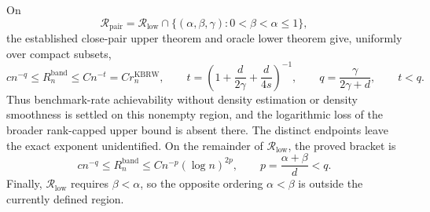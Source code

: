 On
\[
\mathcal R_{\mathrm{pair}}
=\mathcal R_{\mathrm{low}}\cap
\{(\alpha,\beta,\gamma):0<\beta<\alpha\leq1\},
\]
the established close-pair upper theorem and oracle lower theorem give, uniformly
over compact subsets,
\[
c n^{-q}\leq R_n^{\mathrm{band}}
\leq C n^{-t}=C r_n^{\mathrm{KBRW}},
\qquad
t=\left(1+\frac d{2\gamma}+\frac d{4s}\right)^{-1},
\qquad
q=\frac{\gamma}{2\gamma+d},
\qquad t<q.
\]
Thus benchmark-rate achievability without density estimation or density
smoothness is settled on this nonempty region, and the logarithmic loss of the
broader rank-capped upper bound is absent there.  The distinct endpoints leave
the exact exponent unidentified.  On the remainder of
\(\mathcal R_{\mathrm{low}}\), the proved bracket is
\[
c n^{-q}\leq R_n^{\mathrm{band}}
\leq Cn^{-p}(\log n)^{2p},
\qquad p=\frac{\alpha+\beta}{d}<q.
\]
Finally, \(\mathcal R_{\mathrm{low}}\) requires \(\beta<\alpha\), so the
opposite ordering \(\alpha<\beta\) is outside the currently defined region.